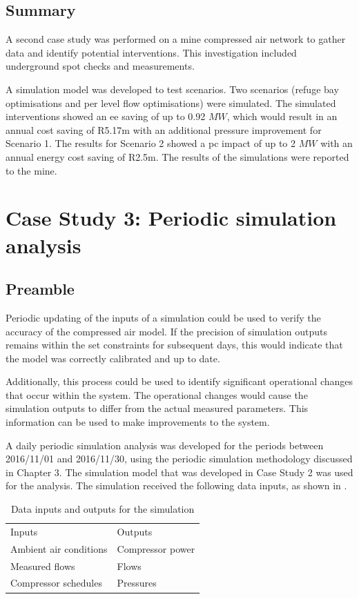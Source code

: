 	\subsection{Summary}
	A second case study was performed on a mine compressed air network to gather data and identify potential interventions. This investigation included underground spot checks and measurements.
	\par 
	 A simulation model was developed to test scenarios. Two scenarios (refuge bay optimisations and per level flow optimisations) were simulated. The simulated interventions showed an \gls{ee} saving of up to 0.92 $MW$, which would result in an annual cost saving of R5.17m with an additional pressure improvement for Scenario 1. The results for Scenario 2 showed a \gls{pc} impact of up to 2 $MW$ with an annual energy cost saving of R2.5m. The results of the simulations were reported to the mine.
\section{Case Study 3: Periodic simulation analysis}
	\subsection{Preamble}
	Periodic updating of the inputs of a simulation could be used to verify the accuracy of the compressed air model. If the precision of simulation outputs remains within the set constraints for subsequent days, this would indicate that the model was correctly calibrated and up to date.
	\par 
	 Additionally, this process could be used to identify significant operational changes that occur within the system. The operational changes would cause the simulation outputs to differ from the actual measured parameters. This information can be used to make improvements to the system.
	\par 
	A daily periodic simulation analysis was developed for the periods between 2016/11/01 and 2016/11/30, using the periodic simulation methodology discussed in Chapter 3. The simulation model that was developed in Case Study 2 was used for the analysis. The simulation received the following data inputs, as shown in .
	\\
	\begin{table}[h!]
		\caption{Data inputs and outputs for the simulation}
		\centering
		\begin{tabular}{ll}
			\hline
			Inputs \hspace*{4cm} &Outputs \hspace*{4cm} \\ \hhline{==}
			Ambient air conditions&Compressor power \\
			Measured flows& Flows \\
			Compressor schedules& Pressures \\
			\hline
		\end{tabular}
		
		\label{table: Periodic inputs/outputs}
	\end{table}

